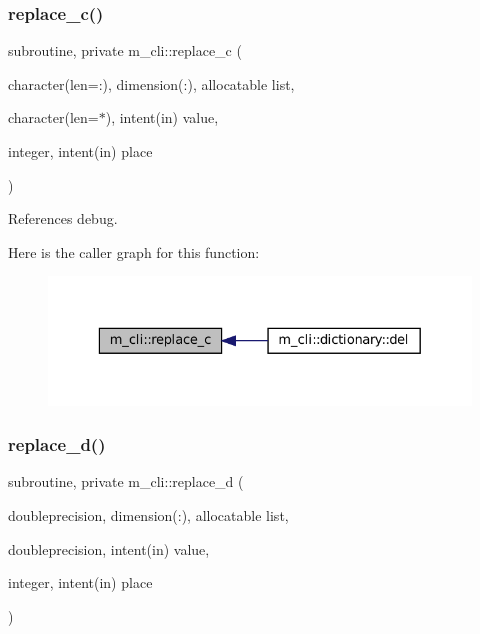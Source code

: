 \subsubsection{\texorpdfstring{replace\+\_\+c()}{replace\_c()}}
{\footnotesize\ttfamily subroutine, private m\+\_\+cli\+::replace\+\_\+c (\begin{DoxyParamCaption}\item[{character(len=\+:), dimension(\+:), allocatable}]{list,  }\item[{character(len=$\ast$), intent(in)}]{value,  }\item[{integer, intent(in)}]{place }\end{DoxyParamCaption})\hspace{0.3cm}{\ttfamily [private]}}



References debug.

Here is the caller graph for this function\+:\nopagebreak
\begin{figure}[H]
\begin{center}
\leavevmode
\includegraphics[width=329pt]{namespacem__cli_a785aa0016768b6dc2e27c29d5342c329_icgraph}
\end{center}
\end{figure}
\mbox{\label{namespacem__cli_aa9b7d672cc9fb0bc79fd09a2870614f5}} 
\subsubsection{\texorpdfstring{replace\+\_\+d()}{replace\_d()}}
{\footnotesize\ttfamily subroutine, private m\+\_\+cli\+::replace\+\_\+d (\begin{DoxyParamCaption}\item[{doubleprecision, dimension(\+:), allocatable}]{list,  }\item[{doubleprecision, intent(in)}]{value,  }\item[{integer, intent(in)}]{place }\end{DoxyParamCaption})\hspace{0.3cm}{\ttfamily [private]}}



